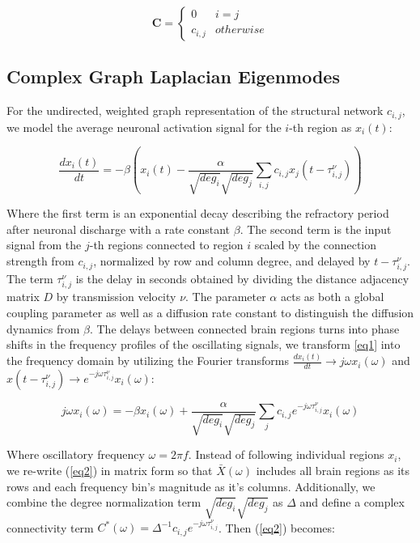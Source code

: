 \documentclass{article}
\begin{document}
\[ \mathbf{C} = \begin{cases}
    0 & i = j\\
    c_{i,j} & otherwise
    \end{cases}
    \]

\subsection{Complex Graph Laplacian Eigenmodes}
For the undirected, weighted graph representation of the structural network $c_{i,j}$, we model the average neuronal activation signal for the $i$-th region as $x_{i}(t)$:

\begin{equation} \label{eq1}
\frac{dx_{i}(t)}{dt} = -\beta (x_{i}(t) - \frac{\alpha}{\sqrt{deg_i}\sqrt{deg_j}} \sum_{i,j} c_{i,j} x_{j}(t-\tau^{\nu}_{i,j}))
\end{equation} 

Where the first term is an exponential decay describing the refractory period after neuronal discharge with a rate constant $\beta$. The second term is the input signal from the $j$-th regions connected to region $i$ scaled by the connection strength from $c_{i,j}$, normalized by row and column degree, and delayed by $t-\tau^{\nu}_{i,j}$. The term $\tau^{\nu}_{i,j}$ is the delay in seconds obtained by dividing the distance adjacency matrix $D$ by transmission velocity $\nu$. The parameter $\alpha$ acts as both a global coupling parameter as well as a diffusion rate constant to distinguish the diffusion dynamics from $\beta$. The delays between connected brain regions turns into phase shifts in the frequency profiles of the oscillating signals, we transform \ref{eq1} into the frequency domain by utilizing the Fourier transforms $\frac{dx_{i}(t)}{dt} \to j\omega x_{i}(\omega)$ and $x(t-\tau^{\nu}_{i,j}) \to e^{-j\omega \tau^{\nu}_{i,j}} x_{i}(\omega)$:

\begin{equation}
\label{eq2}
j\omega x_{i}(\omega) = -\beta x_{i}(\omega) + \frac{\alpha}{\sqrt{deg_i}\sqrt{deg_j}} \sum_j c_{i,j} e^{-j\omega \tau^{\nu}_{i,j}} x_{i}(\omega)
\end{equation}

Where oscillatory frequency $\omega = 2 \pi f$. Instead of following individual regions $x_{i}$, we re-write (\ref{eq2}) in matrix form so that $\bar{X}(\omega)$ includes all brain regions as its rows and each frequency bin's magnitude as it's columns. Additionally, we combine the degree normalization term $\sqrt{deg_i}\sqrt{deg_j}$ as $\Delta$ and define a complex connectivity term $C^{*}(\omega) = \Delta^{-1} c_{i,j}e^{-j\omega \tau^{\nu}_{i,j}}$. Then (\ref{eq2}) becomes:
\end{document}

